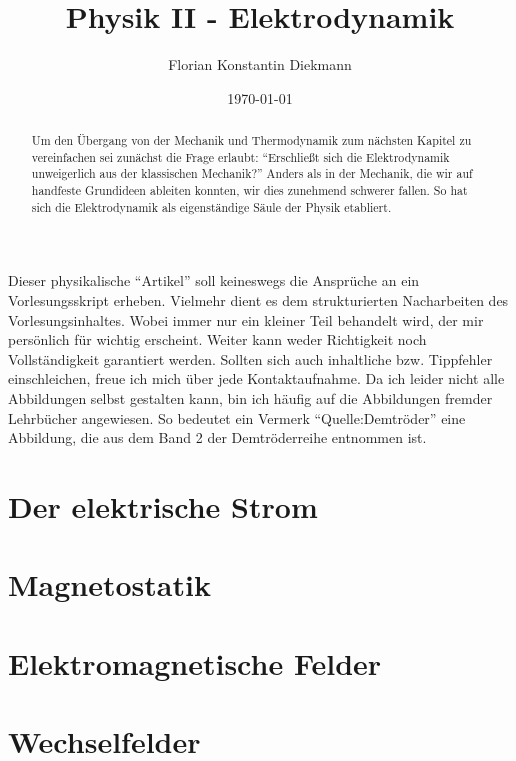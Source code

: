 
\title{Physik II - Elektrodynamik}
\author{Florian Konstantin Diekmann}
\date{\today}



\maketitle
\begin{abstract}
Um den Übergang von der Mechanik und Thermodynamik zum nächsten Kapitel zu vereinfachen sei zunächst die Frage erlaubt: "`Erschließt sich die Elektrodynamik unweigerlich aus der klassischen Mechanik?"' Anders als in der Mechanik, die wir auf handfeste Grundideen ableiten konnten, wir dies zunehmend schwerer fallen. So hat sich die Elektrodynamik als eigenständige Säule der Physik etabliert. 
\end{abstract}
  

Dieser physikalische "`Artikel"' soll keineswegs die Ansprüche an ein Vorlesungsskript erheben. Vielmehr dient es  
dem strukturierten Nacharbeiten des Vorlesungsinhaltes. Wobei immer nur ein kleiner Teil behandelt wird, der mir persönlich für wichtig erscheint. Weiter kann weder   Richtigkeit noch  Vollständigkeit  garantiert werden. Sollten sich auch  inhaltliche bzw. Tippfehler einschleichen, freue ich mich über jede Kontaktaufnahme.  Da ich leider nicht alle Abbildungen selbst gestalten kann, bin ich häufig auf die Abbildungen fremder Lehrbücher angewiesen. So bedeutet ein Vermerk "`Quelle:Demtröder"' eine Abbildung, die aus dem Band 2 der Demtröderreihe entnommen ist.
\newpage
\tableofcontents
\newpage
%
%

\section{Der elektrische Strom}
\section{Magnetostatik}
\section{Elektromagnetische Felder}
\section{Wechselfelder}

